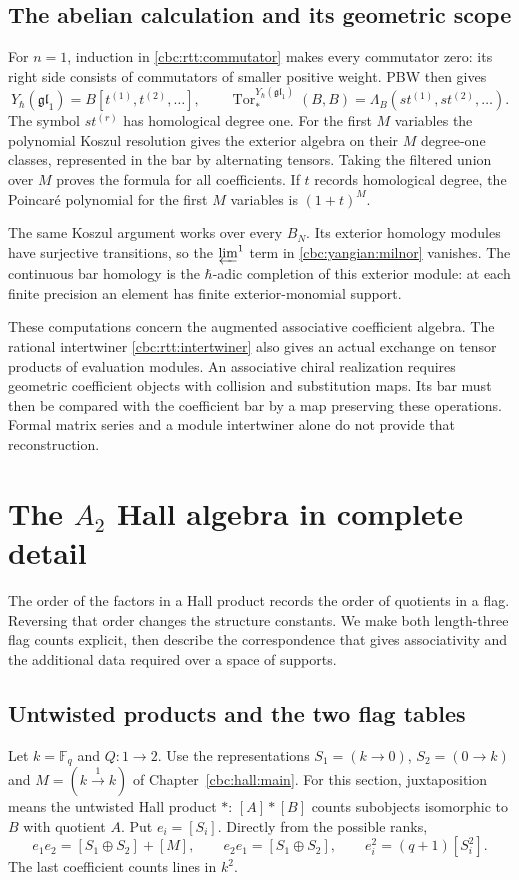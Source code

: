 \section{The abelian calculation and its geometric scope}

For $n=1$, induction in \eqref{cbc:rtt:commutator} makes every
commutator zero: its right side consists of commutators of smaller
positive weight.  PBW then gives
\[
 Y_\hbar(\mathfrak{gl}_1)=B[t^{(1)},t^{(2)},\ldots],\qquad
 \operatorname{Tor}^{Y_\hbar(\mathfrak{gl}_1)}_*(B,B)
   =\Lambda_B(s t^{(1)},s t^{(2)},\ldots).
\]
The symbol $s t^{(r)}$ has homological degree one.  For the first $M$
variables the polynomial Koszul resolution gives the exterior algebra
on their $M$ degree-one classes, represented in the bar by alternating
tensors.  Taking the filtered union over $M$ proves the formula for
all coefficients.  If $t$ records homological degree, the Poincar\'e
polynomial for the first $M$ variables is $(1+t)^M$.

The same Koszul argument works over every $B_N$.  Its exterior homology
modules have surjective transitions, so the $\varprojlim^1$ term in
\eqref{cbc:yangian:milnor} vanishes.  The continuous bar homology is
the $\hbar$-adic completion of this exterior module: at each finite
precision an element has finite exterior-monomial support.

These computations concern the augmented associative coefficient
algebra.  The rational intertwiner
\eqref{cbc:rtt:intertwiner} also gives an actual exchange on tensor
products of evaluation modules.  An associative chiral realization
requires geometric coefficient objects with collision and substitution
maps.  Its bar must then be compared with the coefficient bar by a map
preserving these operations.
Formal matrix series and a module intertwiner alone do not provide
that reconstruction.

\chapter{The \(A_2\) Hall algebra in complete detail}\label{chap:hall}
The order of the factors in a Hall product records the order of quotients in
a flag.  Reversing that order changes the structure constants.  We make both
length-three flag counts explicit, then describe the correspondence that gives
associativity and the additional data required over a space of supports.

\section{Untwisted products and the two flag tables}
Let $k=\mathbb F_q$ and $Q:1\to2$.  Use the representations
$S_1=(k\to0)$, $S_2=(0\to k)$ and $M=(k\xrightarrow{1}k)$ of
Chapter~\ref{cbc:hall:main}.  For this section, juxtaposition means the
untwisted Hall product $*$: $[A]*[B]$ counts subobjects isomorphic to $B$
with quotient $A$.  Put $e_i=[S_i]$.  Directly from the possible ranks,
\[
 e_1e_2=[S_1\oplus S_2]+[M],\qquad
 e_2e_1=[S_1\oplus S_2],\qquad
 e_i^2=(q+1)[S_i^2].
\]
The last coefficient counts lines in $k^2$.

